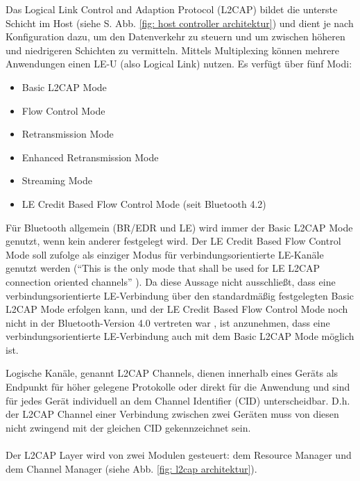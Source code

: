 Das Logical Link Control and Adaption Protocol (L2CAP) bildet die unterste Schicht im Host (siehe S. \pageref{fig: host controller architektur} Abb. \ref{fig: host controller architektur}) und dient je nach Konfiguration dazu, um den Datenverkehr zu steuern und um zwischen höheren und niedrigeren Schichten zu vermitteln. Mittels Multiplexing können mehrere Anwendungen einen LE-U (also Logical Link) nutzen.
Es verfügt über fünf Modi:
\begin{itemize}
    \item Basic L2CAP Mode
    \item Flow Control Mode
    \item Retransmission Mode
    \item Enhanced Retransmission Mode
    \item Streaming Mode
    \item LE Credit Based Flow Control Mode (seit Bluetooth 4.2)
\end{itemize}
Für Bluetooth allgemein (BR/EDR und LE) wird immer der Basic L2CAP Mode genutzt, wenn kein anderer festgelegt wird. Der LE Credit Based Flow Control Mode soll \cite{BtSpec4.2_1735} zufolge als einziger Modus für verbindungsorientierte LE-Kanäle genutzt werden ("`This is the only mode that shall be used for LE L2CAP connection oriented channels"' \cite{BtSpec4.2_1735}). Da diese Aussage nicht ausschließt, dass eine verbindungsorientierte LE-Verbindung über den standardmäßig festgelegten Basic L2CAP Mode erfolgen kann, und der LE Credit Based Flow Control Mode noch nicht in der Bluetooth-Version 4.0 vertreten war \cite{BtSpec4.0_1401}, ist anzunehmen, dass eine verbindungsorientierte LE-Verbindung auch mit dem Basic L2CAP Mode möglich ist.

Logische Kanäle, genannt L2CAP Channels, dienen innerhalb eines Geräts als Endpunkt für höher gelegene Protokolle oder direkt für die Anwendung und sind für jedes Gerät individuell an dem Channel Identifier (CID) unterscheidbar. D.h. der L2CAP Channel einer Verbindung zwischen zwei Geräten muss von diesen nicht zwingend mit der gleichen CID gekennzeichnet sein. 
\\\\
Der L2CAP Layer wird von zwei Modulen gesteuert: dem Resource Manager und dem Channel Manager (siehe Abb. \ref{fig: l2cap architektur}).

